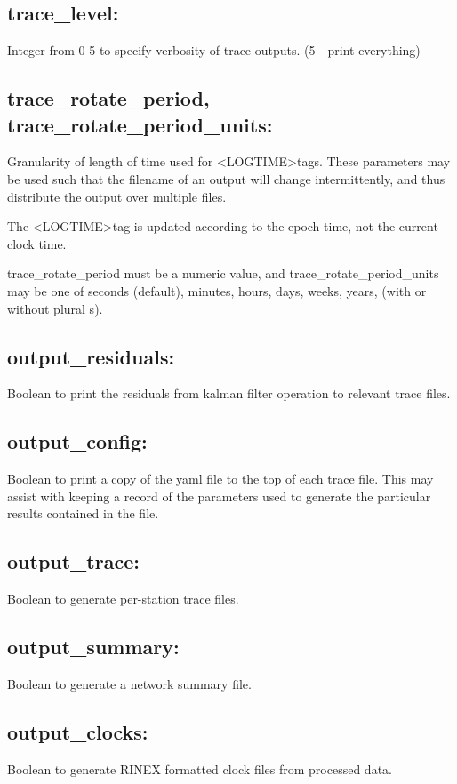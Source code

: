 \subsection*{trace\_level:}
Integer from 0-5 to specify verbosity of trace outputs. (5 - print everything)

\subsection*{trace\_rotate\_period, trace\_rotate\_period\_units:}
Granularity of length of time used for \textless LOGTIME\textgreater tags. These parameters may be used such that the filename of an output will change intermittently, and thus distribute the output over multiple files.

The \textless LOGTIME\textgreater tag is updated according to the epoch time, not the current clock time.

trace\_rotate\_period must be a numeric value, and trace\_rotate\_period\_units may be one of seconds (default), minutes, hours, days, weeks, years, (with or without plural s).

\subsection*{output\_residuals:}
Boolean to print the residuals from kalman filter operation to relevant trace files.

\subsection*{output\_config:}
Boolean to print a copy of the yaml file to the top of each trace file. This may assist with keeping a record of the parameters used to generate the particular results contained in the file.

\subsection*{output\_trace:}
Boolean to generate per-station trace files.

\subsection*{output\_summary:}
Boolean to generate a network summary file.

\subsection*{output\_clocks:}
Boolean to generate RINEX formatted clock files from processed data.

